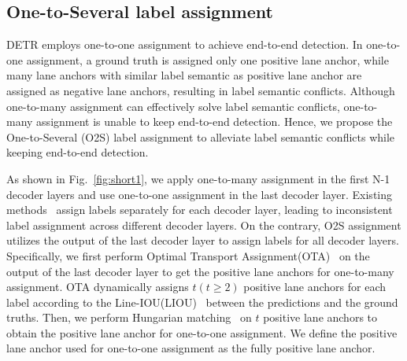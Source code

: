 \documentclass{bmvc2k}
\begin{document}
\subsection{One-to-Several label assignment}
\label{sec:assignment}
DETR employs one-to-one assignment to achieve end-to-end detection. In one-to-one 
assignment, a ground truth is assigned only one positive lane anchor, while many lane anchors 
with similar label semantic as positive lane anchor are assigned as negative lane anchors, resulting in label semantic  
conflicts. Although one-to-many assignment can effectively solve label semantic conflicts, 
one-to-many assignment is unable to keep end-to-end detection. 
Hence, we propose the One-to-Several (O2S) label assignment to alleviate label semantic conflicts while keeping end-to-end detection. 

As shown in Fig.~\ref{fig:short1}, we apply one-to-many assignment in the first N-1 decoder layers and use one-to-one assignment in the last decoder layer. Existing methods~\cite{zhang2020bridging,kim2020probabilistic} assign labels separately for each decoder layer, 
leading to inconsistent label assignment across different decoder layers. On the contrary, O2S assignment
utilizes the output of the last decoder layer to assign labels for all decoder layers. 
Specifically, we first perform Optimal Transport Assignment(OTA)~\cite{ge2021ota} on the output of the last decoder layer to get the positive lane anchors for one-to-many assignment. 
OTA dynamically assigns $t\left(t\geq 2\right)$ positive lane anchors for each label
according to the Line-IOU(LIOU)~\cite{zheng2022clrnet} between the predictions and the ground truths.  
Then, we perform Hungarian matching~\cite{carion2020end} on $t$ positive lane anchors to obtain the positive lane anchor for one-to-one assignment.
We define the positive lane anchor used for one-to-one assignment as the fully positive lane anchor. 
\end{document}
